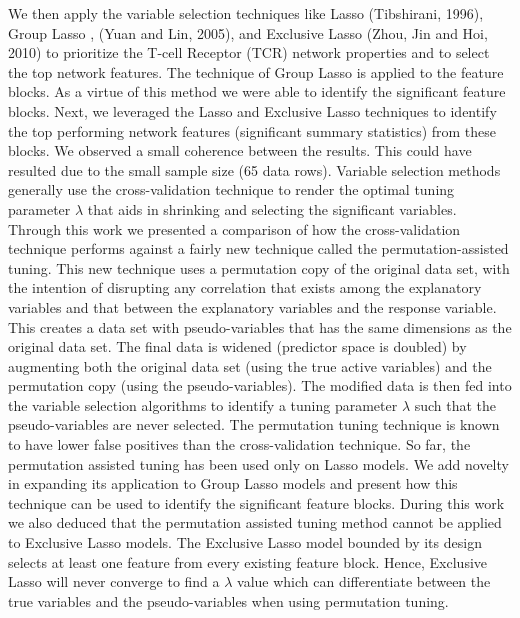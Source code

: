 We then apply the variable selection techniques like Lasso (\cite{tibshir}Tibshirani, 1996), Group Lasso , (\cite{grouporigin}Yuan and Lin, 2005), and Exclusive Lasso (\cite{exclusv_lasso}Zhou, Jin and Hoi, 2010) to prioritize the T-cell Receptor (TCR) network properties and to select the top network features. The technique of Group Lasso is applied to the feature blocks. As a virtue of this method we were able to identify the significant feature blocks. Next, we leveraged the Lasso and Exclusive Lasso techniques to identify the top performing network features (significant summary statistics) from these blocks. We observed a small coherence between the results. This could have resulted due to the small sample size (65 data rows). Variable selection methods generally use the cross-validation technique to render the optimal tuning parameter $\lambda$ that aids in shrinking and selecting the significant variables. Through this work we presented a comparison of how the cross-validation technique performs against a fairly new technique called the permutation-assisted tuning. This new technique uses a permutation copy of the original data set, with the intention of disrupting any correlation that exists among the explanatory variables and that between the explanatory variables and the response variable. This creates a data set with pseudo-variables that has the same dimensions as  the original data set. The final data is widened (predictor space is doubled) by augmenting both the original data set (using the true active variables) and the permutation copy (using the pseudo-variables). The modified data is then fed into the variable selection algorithms to identify a tuning parameter $\lambda$ such that the pseudo-variables are never selected. The permutation tuning technique is known to have lower false positives than the cross-validation technique. So far, the permutation assisted tuning has been used only on Lasso models. We add novelty in expanding its application to Group Lasso models and present how this technique can be used to identify the significant feature blocks. During this work we also deduced that the permutation assisted tuning method cannot be applied to Exclusive Lasso models. The Exclusive Lasso model bounded by its design selects at least one feature from every existing feature block. Hence, Exclusive Lasso will never converge to find a $\lambda$ value which can differentiate between the true variables and the pseudo-variables when using permutation tuning.\par

